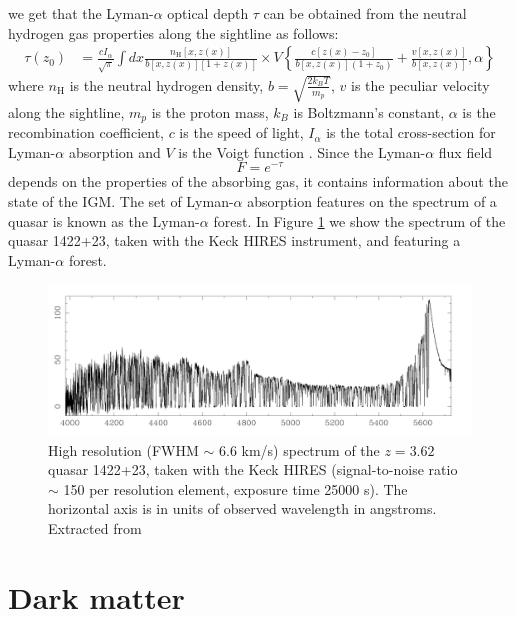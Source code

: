 we get that the Lyman-$\alpha$ optical depth $\tau$ can be obtained from the neutral hydrogen gas properties along the sightline as follows:
\begin{equation}\label{eq:lyman opacity}
    \begin{aligned}\tau(z_0)&=\frac{cI_\alpha}{\sqrt{\pi}}\int dx\frac{n_{\mathrm{H}}[x,z(x)]}{b[x,z(x)][1+z(x)]}\times V\left\{\frac{c[z(x)-z_0]}{b[x,z(x)](1+z_0)}+\frac{v[x,z(x)]}{b[x,z(x)]},\alpha\right\}\end{aligned}
\end{equation} 
where $n_\text{H}$ is the neutral hydrogen density, $b=\sqrt{\frac{2k_BT}{m_p}}$, $v$ is the peculiar velocity along the sightline, $m_p$ is the proton mass, $k_B$ is Boltzmann's constant, $\alpha$ is the recombination coefficient, $c$ is the speed of light, $I_\alpha$ is the total cross-section for Lyman-$\alpha$ absorption and $V$ is the Voigt function \cite{Choudhury_2001}. Since the Lyman-$\alpha$ flux field $$F=e^{-\tau}$$ depends on the properties of the absorbing gas, it contains information about the state of the IGM. The set of Lyman-$\alpha$ absorption features on the spectrum of a quasar is known as the Lyman-$\alpha$ forest. In Figure \ref{fig:forest} we show the spectrum of the quasar 1422+23, taken with the Keck HIRES instrument, and featuring a Lyman-$\alpha$ forest.

\begin{figure}[ht]
    \centering
    \includegraphics[width=1\linewidth]{img/ML/forest.png}
    \caption{High resolution (FWHM $\sim$ 6.6 km/s) spectrum of the $z = 3.62$ quasar 1422+23, taken with the Keck HIRES (signal-to-noise ratio $\sim$ 150 per resolution element, exposure time 25000 s). The horizontal axis is in units of observed wavelength in angstroms. Extracted from \cite{Rauch_1998}}
    \label{fig:forest}
\end{figure}

\section{Dark matter}\label{sec:DM}

